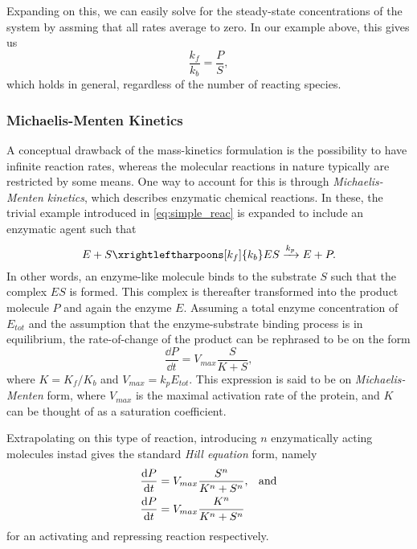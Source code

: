 Expanding on this, we can easily solve for the steady-state concentrations of
the system by assming that all rates average to zero. In our example above, this
gives us 
\begin{equation}
  \frac{k_f}{k_b} = \frac{P}{S},
  \label{eq:mass_action_ss}
\end{equation}
which holds in general, regardless of the number of reacting species.

\subsubsection[Michaelis-Menten Kinetics]{Michaelis-Menten Kinetics}
\label{sec:mm}
A conceptual drawback of the mass-kinetics formulation is the possibility to
have infinite reaction rates, whereas the molecular reactions in nature typically
are restricted by some means. One way to account for this is through
\textit{Michaelis-Menten kinetics}, which describes enzymatic chemical
reactions. In these, the trivial example introduced in \cref{eq:simple_reac} is
expanded to include an enzymatic agent such that
\begin{equation}
  E + S \xrightleftharpoons[k_f]{k_b} ES \xrightarrow{k_p} E + P.
  \label{eq:enzymatic_react}
\end{equation}
In other words, an enzyme-like molecule binds to the substrate $S$ such that the
complex $ES$ is formed. This complex is thereafter transformed into the product
molecule $P$ and again the enzyme $E$. Assuming a total enzyme concentration of
$E_{tot}$ and the assumption that the enzyme-substrate binding process is in
equilibrium, the rate-of-change of the product can be rephrased to be on the
form 
\begin{equation}
  \frac{\dd P}{\dd t} = V_{max} \frac{S}{K + S},
  \label{eq:michaelis-menten}
\end{equation}
where $K = K_f / K_b$ and $V_{max} = k_pE_{tot}$. This expression is said to be
on \textit{Michaelis-Menten} form, where $V_{max}$ is the maximal
activation rate of the protein, and $K$ can be thought of as a saturation
coefficient.

Extrapolating on this type of reaction, introducing $n$ enzymatically acting
molecules instad gives the standard \textit{Hill equation} form, namely
\begin{align}
  \frac{\dd P}{\dd t} &= V_{max} \frac{S^n}{K^n + S^n},\hspace{.8em} \text{and} \\
  \frac{\dd P}{\dd t} &= V_{max} \frac{K^n}{K^n + S^n}
  \label{eq:hill}
\end{align}
for an activating and repressing reaction respectively.

